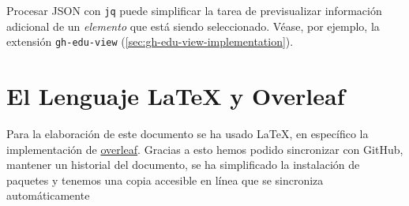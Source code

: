 Procesar JSON con \verb|jq| puede simplificar la tarea de previsualizar información adicional de un \emph{elemento} que está siendo seleccionado. Véase, por ejemplo, la extensión {\tt gh-edu-view} (\ref{sec:gh-edu-view-implementation}).

\section{El Lenguaje \LaTeX{} y Overleaf}
Para la elaboración de este documento se ha usado \LaTeX{}, 
en específico la implementación de \href{https://www.overleaf.com/}{overleaf}\cite{overlife}.
Gracias a esto hemos podido sincronizar con GitHub,
mantener un historial del documento, 
se ha simplificado la instalación de paquetes  y 
tenemos una copia accesible en línea que se sincroniza automáticamente
